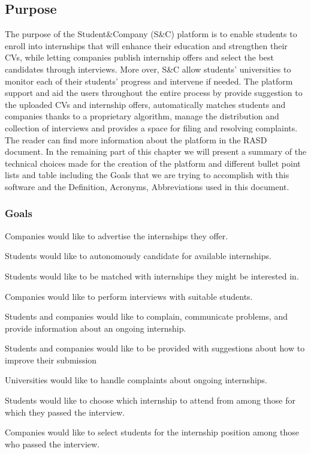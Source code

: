 \subsection{Purpose}
The purpose of the Student\&Company (S\&C) platform is to enable students to enroll into internships that will enhance their education and strengthen their CVs, while letting companies publish internship offers and select the best candidates through interviews. More over, S\&C allow students' universities to monitor each of their students' progress and intervene if needed.
The platform support and aid the users throughout the entire process by provide suggestion to the uploaded CVs and internship offers, automatically matches students and companies thanks to a proprietary algorithm, manage the distribution and collection of interviews and provides a space for filing and resolving complaints. The reader can find more information about the platform in the RASD document. 
In the remaining part of this chapter we will present a summary of the technical choices made for the creation of the platform and different bullet point lists and table including the Goals that we are trying to accomplish with this software and the Definition, Acronyms, Abbreviations used in this document.
\subsubsection{Goals}
\begin{enumerate}[label={\color{titleColor}[G\arabic*]}]
\item Companies would like to advertise the internships they offer.
\item Students would like to autonomously candidate for available internships.
\item Students would like to be matched with internships they might be interested in.
\item Companies would like to perform interviews with suitable students.
\item Students and companies would like to complain, communicate problems, and provide information about an ongoing internship.
\item Students and companies would like to be provided with suggestions about how to improve their submission
\item Universities would like to handle complaints about ongoing internships.
\item Students would like to choose which internship to attend from among those for which they passed the interview.
\item Companies would like to select students for the internship position among those who passed the interview.
\end{enumerate}

